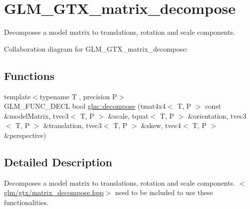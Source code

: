 \hypertarget{group__gtx__matrix__decompose}{\section{G\-L\-M\-\_\-\-G\-T\-X\-\_\-matrix\-\_\-decompose}
\label{group__gtx__matrix__decompose}
}


Decomposes a model matrix to translations, rotation and scale components.  


Collaboration diagram for G\-L\-M\-\_\-\-G\-T\-X\-\_\-matrix\-\_\-decompose\-:
\subsection*{Functions}
\begin{DoxyCompactItemize}
\item 
{\footnotesize template$<$typename T , precision P$>$ }\\G\-L\-M\-\_\-\-F\-U\-N\-C\-\_\-\-D\-E\-C\-L bool \hyperlink{group__gtx__matrix__decompose_ga0f1245817507156b337798a253577c8b}{glm\-::decompose} (tmat4x4$<$ T, P $>$ const \&model\-Matrix, tvec3$<$ T, P $>$ \&scale, tquat$<$ T, P $>$ \&orientation, tvec3$<$ T, P $>$ \&translation, tvec3$<$ T, P $>$ \&skew, tvec4$<$ T, P $>$ \&perspective)
\end{DoxyCompactItemize}


\subsection{Detailed Description}
Decomposes a model matrix to translations, rotation and scale components. $<$\hyperlink{matrix__decompose_8hpp}{glm/gtx/matrix\-\_\-decompose.\-hpp}$>$ need to be included to use these functionalities. 

